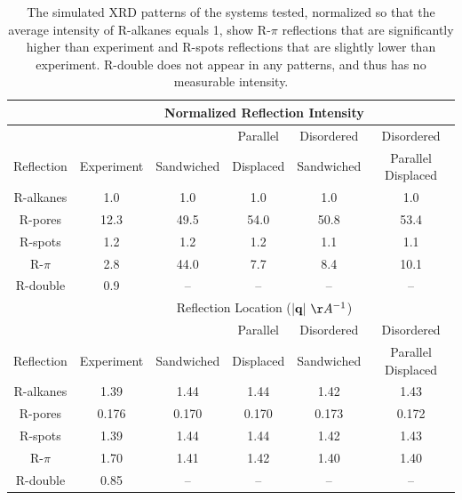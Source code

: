 \documentclass[journal=jpcbfk,manuscript=article]{achemso}
\begin{document}
  \begin{table}[h]
  \centering
  \begin{tabular}{c|ccccc}
  \toprule
 		     & \multicolumn{5}{c}{Normalized Reflection Intensity}                   \\
  \hline
             &            &            & Parallel  & Disordered & Disordered         \\
  Reflection & Experiment & Sandwiched & Displaced & Sandwiched & Parallel Displaced \\
  \midrule
  R-alkanes  & 1.0        &  1.0       &  1.0      &  1.0       &  1.0               \\
  R-pores    & 12.3       & 49.5       & 54.0      & 50.8       & 53.4               \\
  R-spots    & 1.2        &  1.2       &  1.2      &  1.1       &  1.1               \\
  R-$\pi$    & 2.8        & 44.0       &  7.7      &  8.4       & 10.1               \\
  R-double   & 0.9        &  --        & --        &  --        & --                 \\ 
  \hline
   		     & \multicolumn{5}{c}{Reflection Location ($|\mathbf{q}|~\AA^{-1}$)}     \\
  \hline
             &            &            & Parallel  & Disordered & Disordered         \\
  Reflection & Experiment & Sandwiched & Displaced & Sandwiched & Parallel Displaced \\
  \midrule
  R-alkanes  & 1.39       &  1.44      &  1.44     & 1.42       & 1.43               \\  
  R-pores    & 0.176      &  0.170     &  0.170    & 0.173      & 0.172              \\
  R-spots    & 1.39       &  1.44      &  1.44     & 1.42       & 1.43               \\
  R-$\pi$    & 1.70       &  1.41      &  1.42     & 1.40       & 1.40               \\
  R-double   & 0.85       &  --        & --        &  --        & --                 \\ 
  \bottomrule
  \end{tabular}
  \caption{The simulated XRD patterns of the systems tested, normalized so that the average 
  intensity of R-alkanes equals 1, show R-$\pi$ reflections that are significantly higher 
  than experiment and R-spots reflections that are slightly lower than experiment. R-double
  does not appear in any patterns, and thus has no measurable intensity.}
  \label{table:relative_inensities_300K} 
  \end{table}  
  
\end{document}
